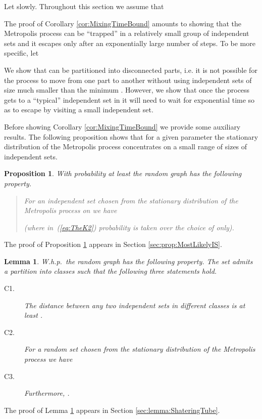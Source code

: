 \documentclass[a4paper,10pt]{article}
\newtheorem{proposition}{Proposition}\renewcommand{\theproposition}{\arabic{proposition}}
\newtheorem{lemma}{Lemma}\renewcommand{\thelemma}{\arabic{lemma}}
\newcommand{\Whp}{W.h.p.}
\begin{document}
Let  slowly. Throughout this section we assume that



\noindent
The proof of Corollary \ref{cor:MixingTimeBound} amounts to showing
that the Metropolis process can be ``trapped'' in a relatively
small group of independent sets and it escapes only after an
exponentially large number of steps. To be more specific, let

We show that  can be partitioned into
disconnected parts, i.e.  it is not possible for the process to
move from one part to another without using independent sets of
size much smaller than the minimum . However, we show that
once the process gets to a ``typical'' independent set in 
it will need to wait for exponential time so as to escape by
visiting a small independent set.



Before showing Corollary \ref{cor:MixingTimeBound} we provide some
auxiliary results. The following proposition shows that for a given
parameter  the stationary distribution of the Metropolis
process concentrates on a small range of sizes of independent sets.



\begin{proposition}\label{prop:MostLikelyIS}
With probability at least  the
random graph  has the following property.
\begin{quote}
For an independent set  chosen from the stationary distribution
of the Metropolis process on  we have
	
(where in~(\ref{eq:TheK2}) probability is taken over the choice of  only).
\end{quote}
\end{proposition}
The proof of Proposition \ref{prop:MostLikelyIS} appears in Section 
\ref{sec:prop:MostLikelyIS}.


\begin{lemma}\label{lemma:ShateringTube}
\Whp\ the random graph  has the following property.
The set 
admits a partition into classes  such that the following three statements hold.
\begin{description}
\item[C1.] The distance between any two independent sets in different classes is at least .
\item[C2.] For a random set  chosen from the stationary distribution of the Metropolis process we have
	
\item[C3.] Furthermore, . 
\end{description}
\end{lemma}
The proof of Lemma \ref{lemma:ShateringTube} appears in
Section \ref{sec:lemma:ShateringTube}.
\end{document}
